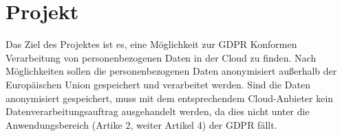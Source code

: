 \section{Projekt}
Das Ziel des Projektes ist es, eine Möglichkeit zur GDPR Konformen Verarbeitung von personenbezogenen Daten in der Cloud zu finden. Nach Möglichkeiten sollen die personenbezogenen Daten anonymisiert außerhalb der Europäischen Union gespeichert und verarbeitet werden.  Sind die Daten anonymisiert gespeichert, muss mit dem entsprechendem Cloud-Anbieter kein Datenverarbeitungsauftrag ausgehandelt werden, da dies nicht unter die Anwendungsbereich (Artike 2, weiter Artikel 4) der GDPR fällt.

